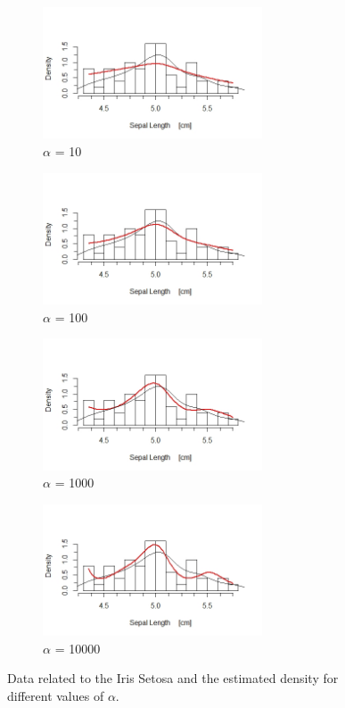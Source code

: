 \begin{figure}[ht]
	
	\begin{subfigure}{.5\textwidth}
		\includegraphics[width=6.5cm]{./pictures/iris/setosa_10.jpeg} 
		\caption*{$\alpha$ = 10}
		\label{fig:subim1}
	\end{subfigure}
	\begin{subfigure}{.5\textwidth}
		\includegraphics[width=6.5cm]{./pictures/iris/setosa_100.jpeg}
		\caption*{$\alpha$ = 100}
		\label{fig:subim2}
	\end{subfigure}

	\begin{subfigure}{.5\textwidth}
		\includegraphics[width=6.5cm]{./pictures/iris/setosa_1000.jpeg} 
		\caption*{$\alpha$ = 1000}
		\label{fig:subim1}
	\end{subfigure}
	\begin{subfigure}{.5\textwidth}
		\includegraphics[width=6.5cm]{./pictures/iris/setosa_10000.jpeg}
		\caption*{$\alpha$ = 10000}
		\label{fig:subim2}
	\end{subfigure}
	\caption{Data related to the Iris Setosa and the estimated density for different values of $\alpha$.}
	\label{fig:setosa}
	
\end{figure}

